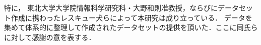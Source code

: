 特に，
東北大学大学院情報科学研究科・大野和則准教授，ならびにデータセット作成に携わったレスキュー犬らによって本研究は成り立っている．
データを集めて体系的に整理して作成されたデータセットの提供を頂いた．ここに同氏らに対して感謝の意を表する．







